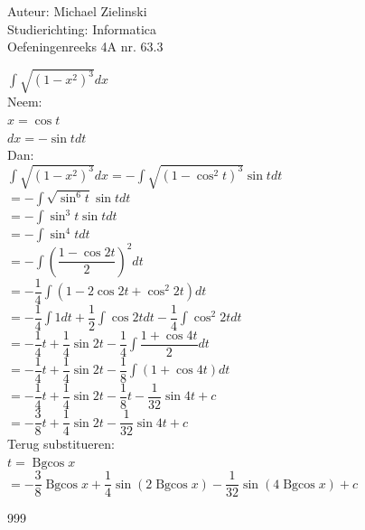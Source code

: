 \documentclass[a4paper]{article}
\begin{document}
  
\noindent \large Auteur: Michael Zielinski \\
\noindent \large Studierichting: Informatica\\
\noindent \large Oefeningenreeks 4A nr. 63.3\\

\medskip

\normalsize

$ \displaystyle\int\sqrt{(1-x^2)^3}dx $ \\

Neem: \\

$ x = \cos t $ \\

$ dx = -\sin t dt $ \\

Dan: \\

$ \displaystyle\int\sqrt{(1-x^2)^3}dx
= -\displaystyle\int\sqrt{(1-\cos^2 t)^3}\sin t dt $ \\

$ = -\displaystyle\int\sqrt{\sin^6 t}\sin t dt $ \\

$ = -\displaystyle\int\sin^3 t \sin t dt $ \\

$ = -\displaystyle\int\sin^4 t dt $ \\

$ = -\displaystyle\int\left(\dfrac{1-\cos 2t}{2}\right)^2 dt $ \\

$ = -\dfrac{1}{4}\displaystyle\int(1-2\cos 2t+\cos^2 2t)dt $ \\

$ = -\dfrac{1}{4}\displaystyle\int 1dt
+ \dfrac{1}{2}\displaystyle\int\cos 2t dt
- \dfrac{1}{4}\displaystyle\int\cos^2 2t dt $ \\

$ = -\dfrac{1}{4}t
+ \dfrac{1}{4}\sin 2t
- \dfrac{1}{4}\displaystyle\int\dfrac{1+\cos 4t}{2}dt $ \\

$ = -\dfrac{1}{4}t
+ \dfrac{1}{4}\sin 2t
- \dfrac{1}{8}\displaystyle\int(1+\cos 4t)dt $ \\

$ = -\dfrac{1}{4}t
+ \dfrac{1}{4}\sin 2t
- \dfrac{1}{8}t
- \dfrac{1}{32}\sin 4t + c $ \\

$ = -\dfrac{3}{8}t
+ \dfrac{1}{4}\sin 2t
- \dfrac{1}{32}\sin 4t + c $ \\

Terug substitueren: \\

$ t = \operatorname{Bgcos}x $ \\

$ = -\dfrac{3}{8}\operatorname{Bgcos}x
+ \dfrac{1}{4}\sin(2\operatorname{Bgcos}x)
- \dfrac{1}{32}\sin(4\operatorname{Bgcos}x) + c $ \\

\begin{thebibliography}{999}
\end{thebibliography}
\end{document}
